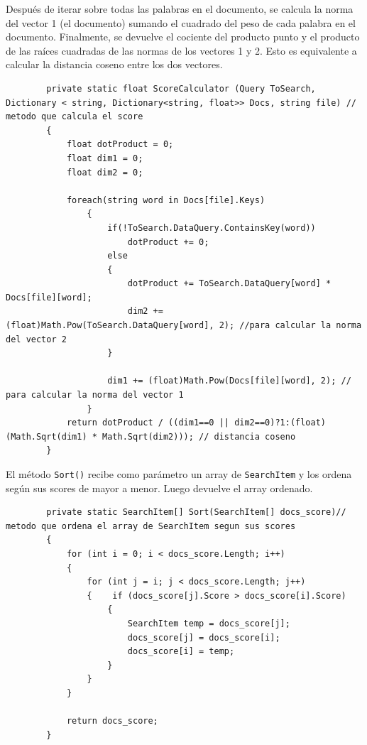 \documentclass[12pt,a4paper]{report}
\begin{document}
Después de iterar sobre todas las palabras en el documento, se calcula la norma del vector 1 (el documento) sumando el cuadrado del peso de cada palabra en el documento. Finalmente, se devuelve el cociente del producto punto y el producto de las raíces cuadradas de las normas de los vectores 1 y 2. Esto es equivalente a calcular la distancia coseno entre los dos vectores.\par

\begin{lstlisting}
        private static float ScoreCalculator (Query ToSearch, Dictionary < string, Dictionary<string, float>> Docs, string file) // metodo que calcula el score
        {
            float dotProduct = 0;
            float dim1 = 0;
            float dim2 = 0;

            foreach(string word in Docs[file].Keys)
                {
                    if(!ToSearch.DataQuery.ContainsKey(word))
                        dotProduct += 0;
                    else
                    {
                        dotProduct += ToSearch.DataQuery[word] * Docs[file][word];  
                        dim2 += (float)Math.Pow(ToSearch.DataQuery[word], 2); //para calcular la norma del vector 2
                    }

                    dim1 += (float)Math.Pow(Docs[file][word], 2); // para calcular la norma del vector 1
                }
            return dotProduct / ((dim1==0 || dim2==0)?1:(float)(Math.Sqrt(dim1) * Math.Sqrt(dim2))); // distancia coseno 
        }
\end{lstlisting}\bigskip

El método \texttt{Sort()} recibe como parámetro un array de \texttt{SearchItem} y los ordena según sus scores de mayor a menor. Luego devuelve el array ordenado.\par

\begin{lstlisting}
        private static SearchItem[] Sort(SearchItem[] docs_score)// metodo que ordena el array de SearchItem segun sus scores
        {
            for (int i = 0; i < docs_score.Length; i++)
            {
                for (int j = i; j < docs_score.Length; j++)
                {    if (docs_score[j].Score > docs_score[i].Score)
                    {
                        SearchItem temp = docs_score[j];
                        docs_score[j] = docs_score[i];
                        docs_score[i] = temp;
                    }
                }
            }

            return docs_score;
        }    

\end{lstlisting}\bigskip
\end{document}
